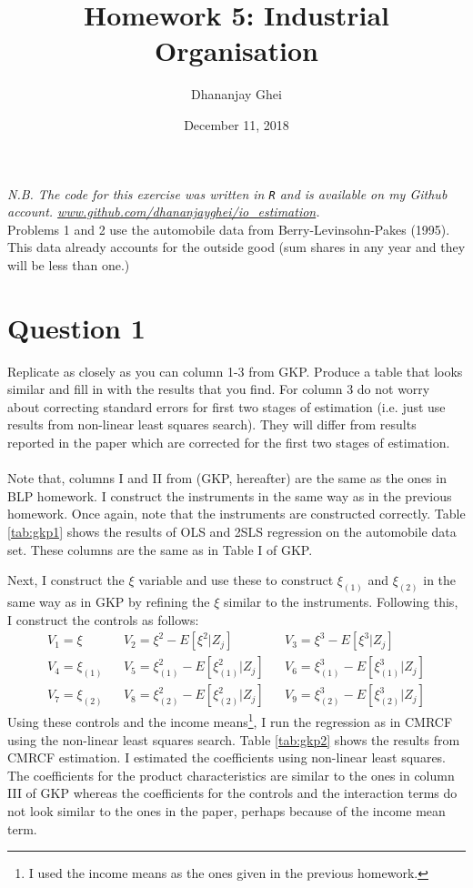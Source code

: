 \documentclass[11pt,letterpaper]{article}
\title{Homework 5: Industrial Organisation} \author{Dhananjay Ghei}
\date{December 11, 2018}
\begin{document}
\maketitle
\textit{N.B. The code for this exercise was written in \texttt{R} and
  is available on my Github
  account. \url{www.github.com/dhananjayghei/io_estimation}.}\\
Problems 1 and 2 use the automobile data from Berry-Levinsohn-Pakes
(1995). This data already accounts for the outside good (sum shares in
any year and they will be less than one.)
\section*{Question 1}
Replicate as closely as you can column 1-3 from GKP. Produce a table
that looks similar and fill in with the results that you find. For
column 3 do not worry about correcting standard errors for first two
stages of estimation (i.e. just use results from non-linear least
squares search). They will differ from results reported in the paper
which are corrected for the first two stages of estimation. \\ \Hline \\

Note that, columns I and II from \citep{GKP}(GKP, hereafter) are the
same as the ones in BLP homework. I construct the instruments in the
same way as in the previous homework. Once again, note that the
instruments are constructed correctly. Table \ref{tab:gkp1} shows the
results of OLS and 2SLS regression on the automobile data set. These
columns are the same as in Table I of GKP.

Next, I construct the $\xi$ variable and use these to construct
$\xi_{(1)}$ and $\xi_{(2)}$ in the same way as in GKP by refining the
$\xi$ similar to the instruments. Following this, I construct the
controls as follows:
\begin{align*}
  V_1 = \xi && V_2 = \xi^2-E[\xi^2 | Z_{j}] && V_3 = \xi^3 -
                                               E[\xi^3 | Z_j]\\
  V_4 = \xi_{(1)} && V_5 = \xi_{(1)}^2 - E[\xi_{(1)}^2 | Z_j]
                                            && V_6 = \xi_{(1)}^3 - E[\xi_{(1)}^3 | Z_j]\\
  V_7 = \xi_{(2)} && V_8 = \xi_{(2)}^2 - E[\xi_{(2)}^2|Z_j] &&
                                                               V_9 = \xi_{(2)}^3 - E[\xi_{(2)}^3 | Z_j]
\end{align*}
Using these controls and the income means\footnote{I used the income
  means as the ones given in the previous homework.}, I run the
regression as in CMRCF using the non-linear least squares
search. Table \ref{tab:gkp2} shows the results from CMRCF
estimation. I estimated the coefficients using non-linear least
squares. The coefficients for the product characteristics are similar
to the ones in column III of GKP whereas the coefficients for the
controls and the interaction terms do not look similar to the ones in
the paper, perhaps because of the income mean term.
\end{document}
